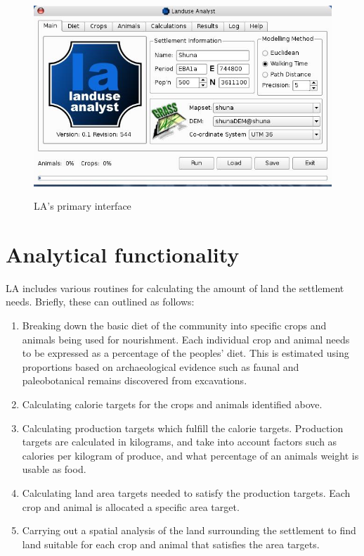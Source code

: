 \begin{figure}[htbp] %
  \includegraphics[scale=0.36]{./images/LanduseAnalyst544.jpg}
   \label{fig:la544} \caption{LA's primary interface}
   \end{figure}


\section{Analytical functionality} \label{sec:Analytical Functionality}

LA includes various routines for calculating the amount of land 
the settlement needs.  Briefly, these can outlined as follows:

  \begin{enumerate} 
  \item Breaking down the basic diet of the community into specific crops and
  animals being used for nourishment.  Each individual crop and animal needs to
  be expressed as a percentage of the peoples' diet.  This is estimated using
  proportions based on archaeological evidence such as faunal and
  paleobotanical remains discovered from excavations.  
  \item Calculating  calorie targets for the crops and animals identified above.
 
  \item Calculating production targets which fulfill the calorie targets.
  Production targets are calculated in kilograms, and take into account factors
such as 
  calories per kilogram of produce, and what percentage of an animals weight is
  usable as food.  
  \item Calculating land area targets needed to satisfy the
  production targets.  Each crop and animal is allocated a specific area
  target.  
  \item Carrying out a spatial analysis of the land surrounding the settlement
to
  find land suitable for each crop and animal that satisfies the area targets.  
  \end{enumerate}

